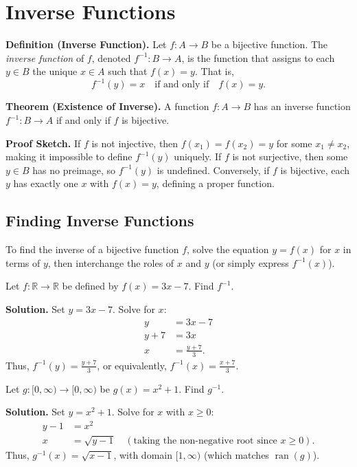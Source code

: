 \documentclass[11pt,a4paper]{article}
\begin{document}
\section{Inverse Functions}

\textbf{Definition (Inverse Function).} Let $f: A \to B$ be a bijective function. The \textit{inverse function} of $f$, denoted $f^{-1}: B \to A$, is the function that assigns to each $y \in B$ the unique $x \in A$ such that $f(x) = y$. That is,
\begin{equation*}
    f^{-1}(y) = x \quad \text{if and only if} \quad f(x) = y.
\end{equation*}

\textbf{Theorem (Existence of Inverse).} A function $f: A \to B$ has an inverse function $f^{-1}: B \to A$ if and only if $f$ is bijective.

\textbf{Proof Sketch.} If $f$ is not injective, then $f(x_1) = f(x_2) = y$ for some $x_1 \neq x_2$, making it impossible to define $f^{-1}(y)$ uniquely. If $f$ is not surjective, then some $y \in B$ has no preimage, so $f^{-1}(y)$ is undefined. Conversely, if $f$ is bijective, each $y$ has exactly one $x$ with $f(x) = y$, defining a proper function.

\subsection{Finding Inverse Functions}

To find the inverse of a bijective function $f$, solve the equation $y = f(x)$ for $x$ in terms of $y$, then interchange the roles of $x$ and $y$ (or simply express $f^{-1}(x)$).

\begin{example}
Let $f: \mathbb{R} \to \mathbb{R}$ be defined by $f(x) = 3x - 7$. Find $f^{-1}$.

\textbf{Solution.} Set $y = 3x - 7$. Solve for $x$:
\begin{align*}
    y &= 3x - 7 \\
    y + 7 &= 3x \\
    x &= \frac{y + 7}{3}.
\end{align*}
Thus, $f^{-1}(y) = \frac{y+7}{3}$, or equivalently, $f^{-1}(x) = \frac{x+7}{3}$.
\end{example}

\begin{example}
Let $g: [0, \infty) \to [0, \infty)$ be $g(x) = x^2 + 1$. Find $g^{-1}$.

\textbf{Solution.} Set $y = x^2 + 1$. Solve for $x$ with $x \geq 0$:
\begin{align*}
    y - 1 &= x^2 \\
    x &= \sqrt{y - 1} \quad (\text{taking the non-negative root since } x \geq 0).
\end{align*}
Thus, $g^{-1}(x) = \sqrt{x - 1}$, with domain $[1, \infty)$ (which matches $\operatorname{ran}(g)$).
\end{example}
\end{document}
